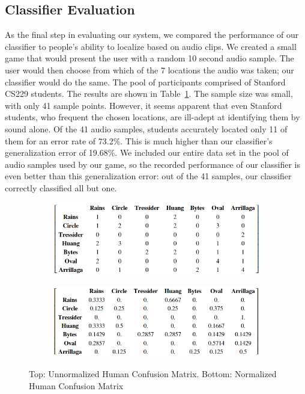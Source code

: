 \documentclass[journal]{IEEEtran}
\begin{document}
\subsection{Classifier Evaluation}
As the final step in evaluating our system, we compared the performance of our classifier to people's ability to localize based on audio clips. We created a small game that would present the user with a random 10 second audio sample. The user would then choose from which of the 7 locations the audio was taken; our classifier would do the same. The pool of participants comprised of Stanford CS229 students. The results are shown in Table~\ref{fig:game_cm}. The sample size was small, with only 41 sample points. However, it seems apparent that even Stanford students, who frequent the chosen locations, are ill-adept at identifying them by sound alone. Of the 41 audio samples, students accurately located only 11 of them for an error rate of 73.2\%. This is much higher than our classifier's generalization error of 19.68\%. We included our entire data set in the pool of audio samples used by our game, so the recorded performance of our classifier is even better than this generalization error: out of the 41 samples, our classifier correctly classified all but one.

\begin{figure}[H]
\centering
\begin{subfigure}{\linewidth}
\centering
\includegraphics[width=0.9\linewidth]{conf_mat_game}
\end{subfigure}\hfill
\begin{subfigure}{\linewidth}
\centering
\includegraphics[width=0.9\linewidth]{conf_mat_game_ratio}
\end{subfigure}
\caption{Top: Unnormalized Human Confusion Matrix. Bottom: Normalized Human Confusion Matrix}
\label{fig:game_cm}
\end{figure}
\end{document}
